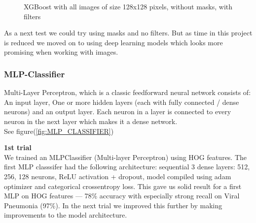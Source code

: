 \documentclass{article}
\begin{document}
\begin{figure}[!ht]
  \centering
  \qquad
  \caption{XGBoost with all images of size 128x128 pixels, without masks, with filters}
  \label{fig:XGBost_classifier_method_128_nomask_withfilter}
\end{figure}

As a next test we could try using masks and no filters. But as time in this project is reduced we moved on to using deep learning models which looks 
more promising when working with images. 

\subsubsection {MLP-Classifier} 
Multi-Layer Perceptron, which is a classic feedforward neural network consists of: An input layer, One or more hidden layers (each with fully connected / dense neurons) and an output layer. Each neuron in a layer is connected to every neuron in the next layer which makes it a dense network.\\ 

See figure(\ref{fig:MLP_CLASSIFIER})
 
\textbf{1st trial}\\We trained an MLPClassifier (Multi-layer Perceptron) using HOG features. The first MLP classsifer had the following architecture: sequential 3 dense layers: 512, 256, 128 neurons, ReLU activation + dropout, model compiled using adam optimizer and categorical crossentropy loss. This gave us solid result for a first MLP on HOG features — 78\% accuracy with especially strong recall on Viral Pneumonia (97\%).
In the next trial we improved this further by making improvements to the model architecture.\\
\end{document}
